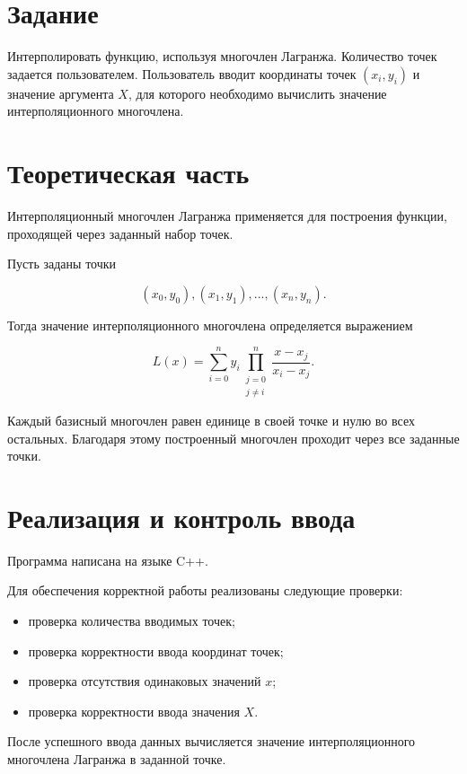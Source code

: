 \documentclass[12pt,a4paper]{article}
\begin{document}
\section{Задание}

Интерполировать функцию, используя многочлен Лагранжа.
Количество точек задается пользователем.
Пользователь вводит координаты точек $(x_i,y_i)$ и значение аргумента $X$, для которого необходимо вычислить значение интерполяционного многочлена.

\section{Теоретическая часть}

Интерполяционный многочлен Лагранжа применяется для построения функции, проходящей через заданный набор точек.

Пусть заданы точки

\[
(x_0,y_0),(x_1,y_1),...,(x_n,y_n).
\]

Тогда значение интерполяционного многочлена определяется выражением

\[
L(x)=\sum_{i=0}^{n}y_i
\prod_{\substack{j=0\\j\neq i}}^{n}
\frac{x-x_j}{x_i-x_j}.
\]

Каждый базисный многочлен равен единице в своей точке и нулю во всех остальных. Благодаря этому построенный многочлен проходит через все заданные точки.

\section{Реализация и контроль ввода}

Программа написана на языке C++.

Для обеспечения корректной работы реализованы следующие проверки:

\begin{itemize}
\item проверка количества вводимых точек;
\item проверка корректности ввода координат точек;
\item проверка отсутствия одинаковых значений $x$;
\item проверка корректности ввода значения $X$.
\end{itemize}

После успешного ввода данных вычисляется значение интерполяционного многочлена Лагранжа в заданной точке.

\newpage
\end{document}
